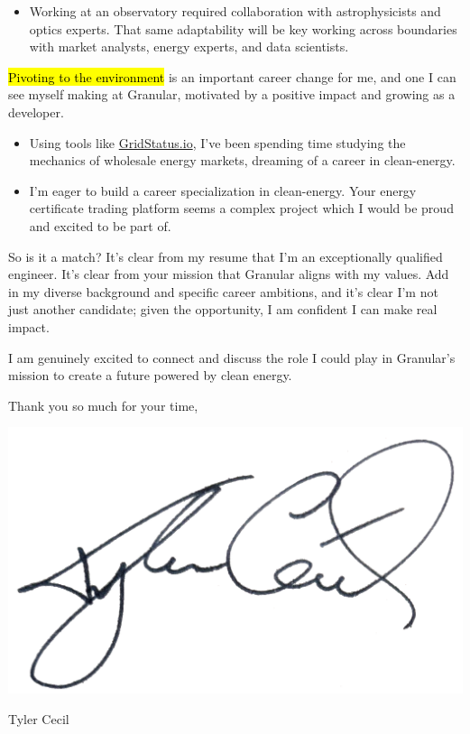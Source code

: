 \documentclass{tc_cv}
\begin{document}
\begin{adjustwidth}{40pt}{40pt}
\begin{itemize}
    \item Working at an observatory required collaboration with astrophysicists
      and optics experts. That same adaptability will be key working across
      boundaries with market analysts, energy experts, and data scientists.

  \end{itemize} \medskip

  \hl{Pivoting to the environment} is an important career change for me, and
  one I can see myself making at Granular, motivated by a positive impact and
  growing as a developer.
  \begin{itemize}

    \item Using tools like \href{http://gridwatch.io}{GridStatus.io}, I've been
      spending time studying the mechanics of wholesale energy markets,
      dreaming of a career in clean-energy.

    \item I'm eager to build a career specialization in clean-energy. Your
      energy certificate trading platform seems a complex project which I would
      be proud and excited to be part of.

  \end{itemize} \medskip

  So is it a match? It's clear from my resume that I'm an exceptionally
  qualified engineer. It's clear from your mission that Granular aligns with my
  values. Add in my diverse background and specific career ambitions, and it's
  clear I'm not just another candidate; given the opportunity, I am confident I
  can make real impact. \medskip

  I am genuinely excited to connect and discuss the role I could play in
  Granular's mission to create a future powered by clean energy.

  \begin{minipage}{0.5\linewidth}
    Thank you so much for your time,
    \vspace{1em}
  \end{minipage}
  \begin{minipage}{0.5\linewidth}
    \hfill\includegraphics[height=4.5\baselineskip]{sig}

    \vspace{-2em}
    \hfill Tyler Cecil
  \end{minipage}

\end{adjustwidth}
\end{document}
